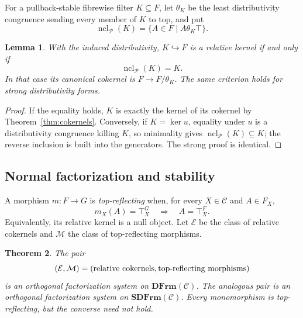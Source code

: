\documentclass[12pt,oneside,reqno]{amsart}
\newtheorem{theorem}{Theorem}[section]
\newtheorem{lemma}[theorem]{Lemma}
\theoremstyle{definition}
\theoremstyle{remark}
\newcommand{\C}{\mathcal C}
\newcommand{\DFrm}{\mathbf{DFrm}}
\newcommand{\SDFrm}{\mathbf{SDFrm}}
\begin{document}
For a pullback-stable fibrewise filter \(K\subseteq F\), let
\(\theta_K\) be the least distributivity congruence sending every member
of \(K\) to top, and put
\[
       \operatorname{ncl}_{\mathcal P}(K)
          =\{A\in F\mid A\mathrel{\theta_K}\top\}.
\]

\begin{lemma}\label{lem:kernel-criterion}
With the induced distributivity, \(K\hookrightarrow F\) is a relative
kernel if and only if
\[
              \operatorname{ncl}_{\mathcal P}(K)=K.
\]
In that case its canonical cokernel is \(F\to F/\theta_K\).  The same
criterion holds for strong distributivity forms.
\end{lemma}

\begin{proof}
If the equality holds, \(K\) is exactly the kernel of its cokernel by
Theorem~\ref{thm:cokernels}.  Conversely, if \(K=\ker u\), equality
under \(u\) is a distributivity congruence killing \(K\), so minimality
gives \(\operatorname{ncl}_{\mathcal P}(K)\subseteq K\); the reverse
inclusion is built into the generators.  The strong proof is identical.
\end{proof}

\subsection{Normal factorization and stability}

A morphism \(m:F\to G\) is \emph{top-reflecting} when, for every
\(X\in\C\) and \(A\in F_X\),
\[
       m_X(A)=\top_X^G\quad\Longrightarrow\quad A=\top_X^F.
\]
Equivalently, its relative kernel is a null object.  Let \(\mathcal E\)
be the class of relative cokernels and \(\mathcal M\) the class of
top-reflecting morphisms.

\begin{theorem}\label{thm:cokernel-factorization-system}
The pair
\[
             (\mathcal E,\mathcal M)
       =(\textup{relative cokernels},\textup{top-reflecting morphisms})
\]
is an orthogonal factorization system on \(\DFrm(\C)\).  The analogous
pair is an orthogonal factorization system on \(\SDFrm(\C)\).  Every
monomorphism is top-reflecting, but the converse need not hold.
\end{theorem}
\end{document}
